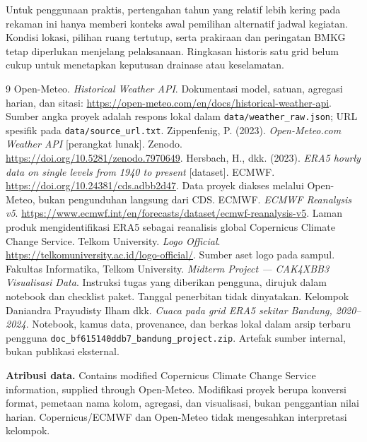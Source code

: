 \documentclass[12pt,a4paper]{article}
\begin{document}
Untuk penggunaan praktis, pertengahan tahun yang relatif lebih kering pada rekaman ini hanya memberi konteks awal pemilihan alternatif jadwal kegiatan. Kondisi lokasi, pilihan ruang tertutup, serta prakiraan dan peringatan BMKG tetap diperlukan menjelang pelaksanaan. Ringkasan historis satu grid belum cukup untuk menetapkan keputusan drainase atau keselamatan.
\clearpage
{}
\begin{thebibliography}{9}
 Open-Meteo. \emph{Historical Weather API}. Dokumentasi model, satuan, agregasi harian, dan sitasi: \url{https://open-meteo.com/en/docs/historical-weather-api}. Sumber angka proyek adalah respons lokal dalam \texttt{data/weather\_raw.json}; URL spesifik pada \texttt{data/source\_url.txt}.
 Zippenfenig, P. (2023). \emph{Open-Meteo.com Weather API} [perangkat lunak]. Zenodo. \url{https://doi.org/10.5281/zenodo.7970649}. 
 Hersbach, H., dkk. (2023). \emph{ERA5 hourly data on single levels from 1940 to present} [dataset]. ECMWF. \url{https://doi.org/10.24381/cds.adbb2d47}. Data proyek diakses melalui Open-Meteo, bukan pengunduhan langsung dari CDS.
 ECMWF. \emph{ECMWF Reanalysis v5}. \url{https://www.ecmwf.int/en/forecasts/dataset/ecmwf-reanalysis-v5}. Laman produk mengidentifikasi ERA5 sebagai reanalisis global Copernicus Climate Change Service.
 Telkom University. \emph{Logo Official}. \url{https://telkomuniversity.ac.id/logo-official/}. Sumber aset logo pada sampul.
 Fakultas Informatika, Telkom University. \emph{Midterm Project --- CAK4XBB3 Visualisasi Data}. Instruksi tugas yang diberikan pengguna, dirujuk dalam notebook dan checklist paket. Tanggal penerbitan tidak dinyatakan. 
 Kelompok Daniandra Prayudisty Ilham dkk. \emph{Cuaca pada grid ERA5 sekitar Bandung, 2020--2024}. Notebook, kamus data, provenance, dan berkas lokal dalam arsip terbaru pengguna \texttt{doc\_bf615140ddb7\_bandung\_project.zip}. Artefak sumber internal, bukan publikasi eksternal.
\end{thebibliography}
\textbf{Atribusi data.} Contains modified Copernicus Climate Change Service information, supplied through Open-Meteo. Modifikasi proyek berupa konversi format, pemetaan nama kolom, agregasi, dan visualisasi, bukan penggantian nilai harian. Copernicus/ECMWF dan Open-Meteo tidak mengesahkan interpretasi kelompok.


\clearpage
\end{document}
